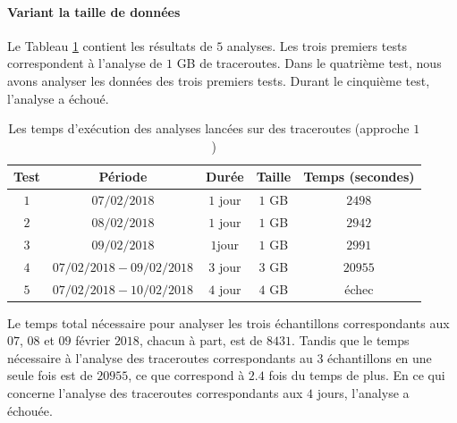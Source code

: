 \paragraph{Variant la taille de données}

 
 Le Tableau \ref{tab:spark-timing} contient les résultats de $5$ analyses. Les trois premiers tests correspondent à l'analyse de $1$ GB de traceroutes. Dans le quatrième test, nous avons analyser les données des trois premiers tests. Durant le cinquième test, l'analyse a échoué. 

\begin{table}[H]
\centering
\captionsetup{justification=centering}
	\begin{tabular}{c cccc}
		
		\textbf{Test}&\textbf{Période} &\textbf{Durée}  & \textbf{Taille}   & \textbf{Temps (secondes)} \\ \hline
		
		$ 1 $&$ 07/02/2018 $&$ 1 $ jour&$ 1 $ GB& $ 2498 $\\ \hline
		$ 2 $&$ 08/02/2018 $&$ 1 $ jour&$ 1 $ GB& $ 2942 $\\ \hline
	$ 	3 $&$ 09/02/2018 $&$ 1  $jour& $ 1 $ GB& $ 2991 $\\ \hline
		$ 4 $&$ 07/02/2018 - 09/02/2018 $&$ 3 $ jour& $ 3 $ GB& $ 20955 $\\ \hline
		$ 5 $&$ 07/02/2018 - 10/02/2018 $&$ 4 $ jour& $ 4 $ GB & échec \\ \hline
	\end{tabular}
	\caption{Les temps d'exécution des analyses lancées sur des traceroutes (approche $1$)}
	\label{tab:spark-timing}
\end{table}

Le temps total nécessaire pour analyser les trois échantillons correspondants aux  $ 07 $, $ 08 $ et $ 09 $ février $ 2018 $, chacun à part,  est de $ 8431 $. Tandis que le temps nécessaire à l'analyse des traceroutes correspondants au 3 échantillons en une seule fois est de $20955$, ce que correspond à $ 2.4 $ fois du temps de plus.
En ce qui concerne l'analyse des traceroutes correspondants aux $ 4 $ jours,  l'analyse a échouée. 

